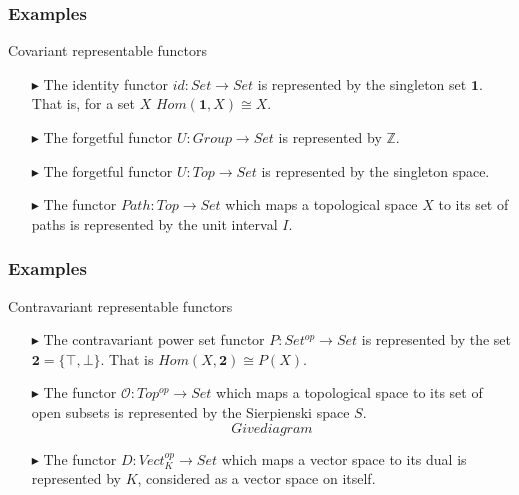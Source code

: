 \documentclass[11pt,compress]{beamer}
\begin{document}
\begin{frame}\label{frame : eg of cov rep func}
\frametitle{Examples}

\begin{block}{Covariant representable functors}
\begin{enumerate}

\item[$\blacktriangleright$] The identity functor $id : Set \to Set$ is represented by
the singleton set $\mathbf{1}$. That is, for a set $X$
$Hom(\mathbf{1}, X) \cong X$.

\item[$\blacktriangleright$] The forgetful functor $U : Group \to Set$ is represented by
$\mathbb{Z}$.

\item[$\blacktriangleright$] The forgetful functor $U : Top \to Set$ is represented by the
singleton space.

\item[$\blacktriangleright$] The functor $Path : Top \to Set$ which maps a topological space
$X$ to its set of paths is represented by the unit interval $I$.
\end{enumerate}

\end{block}

\end{frame}


\begin{frame}\label{frame : eg of contra rep func}

\frametitle{Examples}

\begin{block}{Contravariant representable functors}
\begin{enumerate}

\item[$\blacktriangleright$] 
The contravariant power set functor $P : Set^{op} \to Set$ is represented by the set
$\mathbf{2} = \{\top, \bot\}$. That is $Hom(X,\mathbf{2}) \cong P(X)$.

\item[$\blacktriangleright$] 
The functor $\mathcal{O} : Top^{op} \to Set$ which maps a topological space to its
set of open subsets is represented by the Sierpienski space $S$.
\[ Give diagram\]

\item[$\blacktriangleright$]
The functor $D : Vect_K^{op} \to Set$ which maps a vector space to its dual is represented by
$K$, considered as a vector space on itself.

\end{enumerate}

\end{block}

\end{frame}
\end{document}
